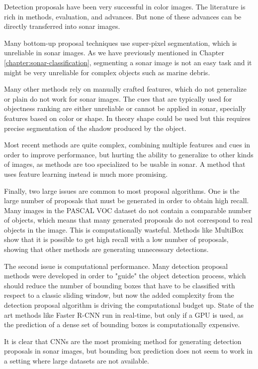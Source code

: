 Detection proposals have been very successful in color images. The literature is rich in methods, evaluation, and advances. But none of these advances can be directly transferred into sonar images.

Many bottom-up proposal techniques use super-pixel segmentation, which is unreliable in sonar images. As we have previously mentioned in Chapter \ref{chapter:sonar-classification}, segmenting a sonar image is not an easy task and it might be very unreliable for complex objects such as marine debris.

Many other methods rely on manually crafted features, which do not generalize or plain do not work for sonar images. The cues that are typically used for objectness ranking are either unreliable or cannot be applied in sonar, specially features based on color or shape. In theory shape could be used but this requires precise segmentation of the shadow produced by the object.

Most recent methods are quite complex, combining multiple features and cues in order to improve performance, but hurting the ability to generalize to other kinds of images, as methods are too specialized to be usable in sonar. A method that uses feature learning instead is much more promising.

Finally, two large issues are common to most proposal algorithms. One is the large number of proposals that must be generated in order to obtain high recall. Many images in the PASCAL VOC dataset do not contain a comparable number of objects, which means that many generated proposals do not correspond to real objects in the image. This is computationally wasteful. Methods like MultiBox show that it is possible to get high recall with a low number of proposals, showing that other methods are generating unnecessary detections.

The second issue is computational performance. Many detection proposal methods were developed in order to "guide" \cite{hosang2014good} the object detection process, which should reduce the number of bounding boxes that have to be classified with respect to a classic sliding window, but now the added complexity from the detection proposal algorithm is driving the computational budget up. State of the art methods like Faster R-CNN run in real-time, but only if a GPU is used, as the prediction of a dense set of bounding boxes is computationally expensive.

It is clear that CNNs are the most promising method for generating detection proposals in sonar images, but bounding box prediction does not seem to work in a setting where large datasets are not available.

